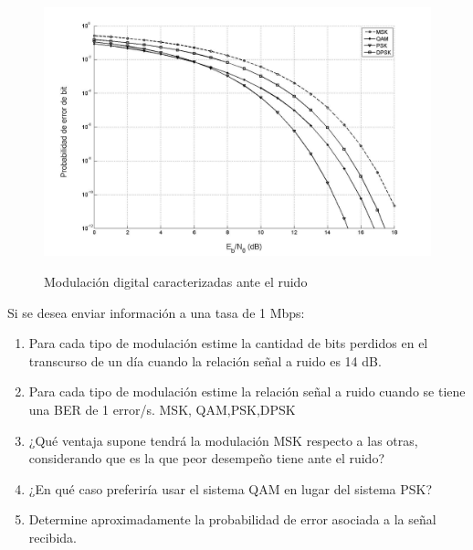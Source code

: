 \begin{enumerate}
\begin{enumerate}
\vspace{400px}
\begin{figure}[h!]
	\captionsetup{justification = raggedright, singlelinecheck = false}
	\caption{Modulación digital caracterizadas ante el ruido } 
	\centering
	\includegraphics[scale=0.4]{Imagenes/figcurvas.png}
	\label{fig:figcurvas}
\end{figure}


	Si se desea enviar información a una tasa de 1 Mbps: 
	\begin{enumerate}
		\item Para cada tipo de modulación estime la cantidad de bits perdidos en el transcurso de un día cuando la relación señal a ruido es 14 dB.
		
		\item Para cada tipo de modulación estime la relación señal a ruido cuando se tiene una BER de 1 error/s. MSK, QAM,PSK,DPSK
		
		
		\item ¿Qué ventaja supone tendrá la modulación MSK respecto a las otras, considerando que es la que peor desempeño tiene ante el ruido?
		
		\item ¿En qué caso preferiría usar el sistema QAM en lugar del sistema PSK?
		
		\item Determine aproximadamente la probabilidad de error asociada a la señal recibida.
		

\end{enumerate}
\end{enumerate}
\end{enumerate}
